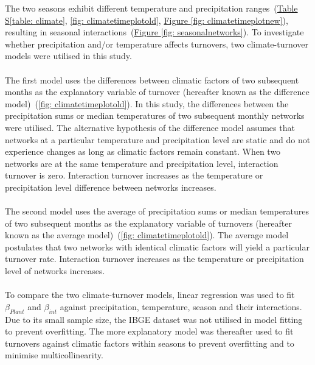 \documentclass[11pt]{article}
\begin{document}
The two seasons exhibit different temperature and precipitation ranges~(\hyperref[table: climate]{Table S\ref{table: climate}}, \autoref{fig: climatetimeplotold}, \hyperref[fig: climatetimeplotnew]{Figure \ref{fig: climatetimeplotnew}}), resulting in seasonal interactions~(\hyperref[fig: seasonalnetworks]{Figure \ref{fig: seasonalnetworks}}). To investigate whether precipitation and/or temperature affects turnovers, two climate-turnover models were utilised in this study. \\
\\
The first model uses the differences between climatic factors of two subsequent months as the explanatory variable of turnover (hereafter known as the difference model)~(\autoref{fig: climatetimeplotold}). In this study, the differences between the precipitation sums or median temperatures of two subsequent monthly networks were utilised. The alternative hypothesis of the difference model assumes that networks at a particular temperature and precipitation level are static and do not experience changes as long as climatic factors remain constant. When two networks are at the same temperature and precipitation level, interaction turnover is zero. Interaction turnover increases as the temperature or precipitation level difference between networks increases.\\
\\
The second model uses the average of precipitation sums or median temperatures of two subsequent months as the explanatory variable of turnovers (hereafter known as the average model)~(\autoref{fig: climatetimeplotold}). The average model postulates that two networks with identical climatic factors will yield a particular turnover rate. Interaction turnover increases as the temperature or precipitation level of networks increases.\\
\\
To compare the two climate-turnover models, linear regression was used to fit $\beta_{Plant}$ and $\beta_{int}$ against precipitation, temperature, season and their interactions. Due to its small sample size, the IBGE dataset was not utilised in model fitting to prevent overfitting. The more explanatory model was thereafter used to fit turnovers against climatic factors within seasons to prevent overfitting and to minimise multicollinearity.
\end{document}
